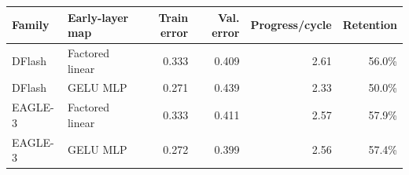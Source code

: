 \begin{tabular}{llrrrr}
\toprule
Family & Early-layer map & Train error & Val. error & Progress/cycle & Retention \\
\midrule
DFlash & Factored linear & 0.333 & 0.409 & 2.61 & 56.0\% \\
DFlash & GELU MLP & 0.271 & 0.439 & 2.33 & 50.0\% \\
EAGLE-3 & Factored linear & 0.333 & 0.411 & 2.57 & 57.9\% \\
EAGLE-3 & GELU MLP & 0.272 & 0.399 & 2.56 & 57.4\% \\
\bottomrule
\end{tabular}
